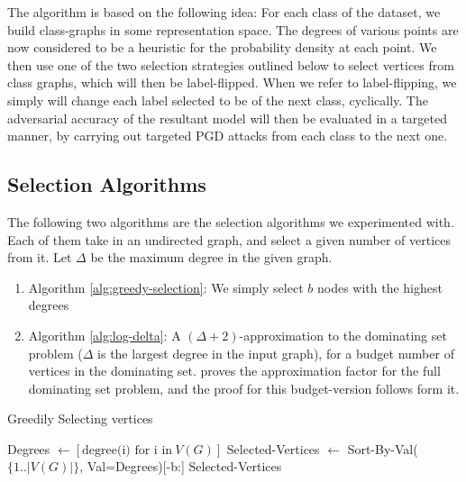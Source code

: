 \documentclass[12pt, oneside]{book}
\begin{document}
The algorithm is based on the following idea: For each class of the dataset, we
build class-graphs in some representation space. The degrees of various points
are now considered to be a heuristic for the probability density at each point.
We then use one of the two selection strategies outlined below to select
vertices from class graphs, which will then be label-flipped. When we refer to
label-flipping, we simply will change each label selected to be of the next
class, cyclically. The adversarial accuracy of the resultant model will then be
evaluated in a targeted manner, by carrying out targeted PGD attacks from each
class to the next one.

\subsection*{Selection Algorithms}
The following two algorithms are the selection algorithms we experimented with.
Each of them take in an undirected graph, and select a given number of vertices
from it. Let $\Delta$ be the maximum degree in the given graph.
\begin{enumerate}
    \item Algorithm \ref{alg:greedy-selection}: We simply select $b$ nodes with
    the highest degrees
    \item Algorithm \ref{alg:log-delta}: A $(\Delta + 2)$-approximation to the
    dominating set problem ($\Delta$ is the largest degree in the input graph),
    for a budget number of vertices in the dominating set.
    \citep{dominating-set} proves the approximation factor for the full
    dominating set problem, and the proof for this budget-version follows form
    it.
\end{enumerate}

\begin{algorithm}[!h]
\caption{Greedily Selecting vertices}
\begin{algorithmic}[1]
    \State Degrees $\gets [\text{degree(i) for i in}~V(G)]$
    \State Selected-Vertices $\gets$ Sort-By-Val($\{1..|V(G)|\}$, Val=Degrees)[-b:]
    \State \Return Selected-Vertices
\EndProcedure
\end{algorithmic}
\label{alg:greedy-selection}
\end{algorithm}
\end{document}
